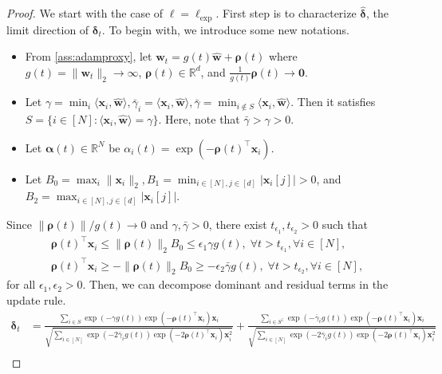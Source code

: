 \documentclass{article} %
\theoremstyle{plain}
\theoremstyle{definition}
\theoremstyle{remark}
\newcommand{\R}{\mathbb{R}}
\def\bdel{{\boldsymbol \delta}}
\def\bw{{\mathbf w}}
\begin{document}
\DirectionProxy*
\begin{proof}
    We start with the case of $\ell = \ell_{\text{exp}}$. First step is to characterize $\hat{\bdel}$, the limit direction of $\bdel_t$. To begin with, we introduce some new notations.
    \begin{itemize}[label=$\cdot$]
        \item From \cref{ass:adamproxy}, let $\bw_t = g(t)\hat{\bw}+\boldsymbol{\rho}(t)$ where $g(t)=\|\bw_t\|_2 \rightarrow \infty$, $\boldsymbol{\rho}(t) \in \R^d$, and $\frac{1}{g(t)}\boldsymbol{\rho}(t) \rightarrow \mathbf{0}$.
        \item Let $\gamma = \min_i \langle \mathbf{x}_i, \hat{\mathbf{w}} \rangle, \bar{\gamma}_i = \langle \mathbf{x}_i, \hat{\mathbf{w}} \rangle, \bar{\gamma} = \min_{i \notin S} \langle \mathbf{x}_i, \hat{\mathbf{w}} \rangle$. Then it satisfies $S = \{ i \in [N] : \langle \mathbf{x}_i, \hat{\mathbf{w}} \rangle = \gamma\}$. Here, note that $\bar{\gamma} > \gamma > 0$. 
        \item Let $\boldsymbol{\alpha}(t) \in \mathbb{R}^N$ be $\alpha_i(t) = \exp(-\boldsymbol{\rho}(t)^\top \mathbf{x}_i)$.
        \item Let $B_0 = \max_i \|\mathbf{x}_i\|_2, B_1 = \min_{i \in [N], j\in[d]} |\mathbf{x}_i[j]|>0$, and $B_2 = \max_{i \in [N], j\in[d]} |\mathbf{x}_i[j]|$. 
    \end{itemize}
    Since $\|\boldsymbol{\rho}(t)\| / g(t) \rightarrow 0$ and $\gamma, \bar{\gamma}>0$, there exist $t_{\epsilon_1}, t_{\epsilon_2} >0$ such that 
    \begin{align*}
        \boldsymbol{\rho}(t)^\top \mathbf{x}_i \leq \|\boldsymbol{\rho}(t)\|_2 B_0 \leq \epsilon_1 \gamma g(t), \; \forall t > t_{\epsilon_1}, \forall i\in [N], \\
        \boldsymbol{\rho}(t)^\top \mathbf{x}_i \geq -\|\boldsymbol{\rho}(t)\|_2 B_0 \geq -\epsilon_2 \bar{\gamma} g(t), \; \forall t > t_{\epsilon_2}, \forall i\in [N],
    \end{align*}
    for all $\epsilon_1, \epsilon_2 > 0$. Then, we can decompose dominant and residual terms in the update rule.
    \begin{align*}
        \bdel_t &= \frac{\sum_{i \in S} \exp(-\gamma g(t))\exp(-\boldsymbol{\rho}(t)^\top \mathbf{x}_i) \mathbf{x}_i}{\sqrt{\sum_{i \in [N]}\exp(-2\bar{\gamma}_i g(t))\exp(-2\boldsymbol{\rho}(t)^\top \mathbf{x}_i) \mathbf{x}_i^2}} + \frac{\sum_{i \in S^\complement} \exp(-\bar{\gamma}_i g(t))\exp(-\boldsymbol{\rho}(t)^\top \mathbf{x}_i) \mathbf{x}_i}{\sqrt{\sum_{i \in [N]}\exp(-2\bar{\gamma}_i g(t))\exp(-2\boldsymbol{\rho}(t)^\top \mathbf{x}_i) \mathbf{x}_i^2}} \\ 

\end{align*}
\end{proof}
\end{document}
